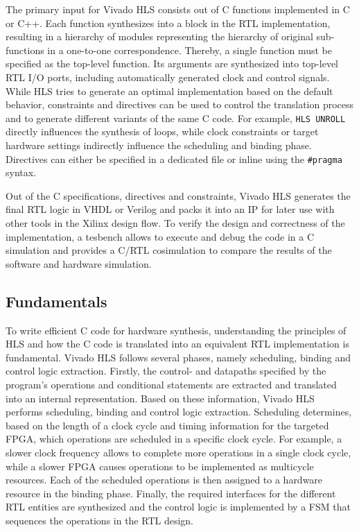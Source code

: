 The primary input for Vivado \ac{HLS} consists out of C functions implemented
in C or C++. Each function synthesizes into a block in the \ac{RTL}
implementation, resulting in a hierarchy of modules representing the hierarchy
of original sub-functions in a one-to-one correspondence. Thereby, a single
function must be specified as the top-level function. Its arguments are
synthesized into top-level \ac{RTL} I/O ports, including automatically
generated clock and control signals. While \ac{HLS} tries to generate an
optimal implementation based on the default behavior, constraints and
directives can be used to control the translation process and to generate
different variants of the same C code. For example, \lstinline{HLS UNROLL}
directly influences the synthesis of loops, while clock constraints or target
hardware settings indirectly influence the scheduling and binding phase.
Directives can either be specified in a dedicated file or inline using the
\lstinline{#pragma} syntax.

Out of the C specifications, directives and constraints, Vivado \ac{HLS}
generates the final \ac{RTL} logic in \ac{VHDL} or Verilog and packs it into
an \ac{IP} for later use with other tools in the Xilinx design flow. To verify
the design and correctness of the implementation, a tesbench allows to execute
and debug the code in a C simulation and provides a C/RTL cosimulation to
compare the results of the software and hardware simulation.

\subsection{Fundamentals}
To write efficient C code for hardware synthesis, understanding the principles
of \ac{HLS} and how the C code is translated into an equivalent \ac{RTL}
implementation is fundamental. Vivado \ac{HLS} follows several phases, namely
scheduling, binding and control logic extraction. Firstly, the control- and
datapaths specified by the program's operations and conditional statements are
extracted and translated into an internal representation. Based on these
information, Vivado HLS performs scheduling, binding and control logic
extraction. Scheduling determines, based on the length of a clock cycle and
timing information for the targeted \ac{FPGA}, which operations are scheduled
in a specific clock cycle. For example, a slower clock frequency allows to
complete more operations in a single clock cycle, while a slower \ac{FPGA}
causes operations to be implemented as multicycle resources. Each of the
scheduled operations is then assigned to a hardware resource in the binding
phase. Finally, the required interfaces for the different \ac{RTL} entities
are synthesized and the control logic is implemented by a \ac{FSM} that
sequences the operations in the \ac{RTL} design.

